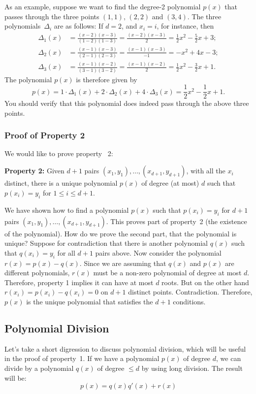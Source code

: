 \documentclass[11pt,fleqn]{article}
\begin{document}
As an example, suppose we want to find the degree-2 polynomial $p(x)$
that passes through the three points $(1,1)$, $(2,2)$ and $(3,4)$.
The three polynomials~$\Delta_i$ are as follows:
If $d = 2$, and $x_i = i$, for instance, then
\begin{align*}
\Delta_1(x) &= \frac{(x - 2)(x - 3)}{(1 - 2)(1 - 3)} = \frac{(x - 2)(x - 3)}{2} = \frac{1}{2}x^2 - \frac{5}{2}x + 3;\\
\Delta_2(x) &= \frac{(x - 1)(x - 3)}{(2 - 1)(2 - 3)} = \frac{(x - 1)(x - 3)}{-1} = -x^2 +4x -3;\\
\Delta_3(x) &= \frac{(x - 1)(x - 2)}{(3 - 1)(3 - 2)} = \frac{(x - 1)(x - 2)}{2} = \frac{1}{2}x^2 -\frac{3}{2}x +1.
\end{align*}
The polynomial $p(x)$ is therefore given by $$
  p(x) = 1\cdot\Delta_1(x) + 2\cdot\Delta_2(x) + 4\cdot\Delta_3(x) = \frac{1}{2}x^2 -\frac{1}{2}x +1.  $$
You should verify that this polynomial does indeed pass through the above three points.

\subsubsection*{Proof of Property 2}

We would like to prove property ~2:

\noindent
{\bf Property 2:} Given $d+1$ pairs $(x_1, y_1), \ldots, (x_{d+1}, y_{d+1})$,
with all the $x_i$ distinct, 
there is a unique polynomial $p(x)$ of degree (at most) $d$ such that
$p(x_i) = y_i$ for $1 \leq i \leq d+1$.

We have shown how to find a polynomial $p(x)$ such that $p(x_i) = y_i$
for $d+1$ pairs $(x_1,y_1),\dots,(x_{d+1},y_{d+1})$.
This proves part of property~2 (the existence of the polynomial).  How do
we prove the second part, that the polynomial is unique? 
Suppose for contradiction that there is another polynomial $q(x)$ such that $q(x_i) = y_i$
for all $d+1$ pairs above. 
Now consider the polynomial $r(x) = p(x) - q(x)$. Since we are assuming that $q(x)$ and $p(x)$
are different polynomials, $r(x)$ must be a non-zero polynomial of degree at most $d$. 
Therefore, property 1 implies it can have at most $d$ roots.
But on the other hand $r(x_i) = p(x_i) - q(x_i) = 0$ on $d+1$ distinct
points. Contradiction. Therefore, $p(x)$ is the unique polynomial that
satisfies the $d+1$ conditions.

\subsection*{Polynomial Division}
Let's take a short digression to discuss polynomial division,
which will be useful in the proof of property~1. 
If we have a polynomial $p(x)$ of degree $d$, we can divide by 
a polynomial $q(x)$ of degree $\leq d$ by using long division. The result will be:
$$
p(x) = q(x)q'(x) + r(x)
$$
\end{document}

